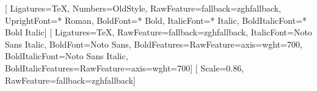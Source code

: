 
\usepackage{fontspec}
\usepackage{unicode-math}
\setmainfont{Charter}[
  Ligatures=TeX, Numbers=OldStyle,
  RawFeature={fallback=zghfallback},
  UprightFont={* Roman}, BoldFont={* Bold},
  ItalicFont={* Italic}, BoldItalicFont={* Bold Italic}]
\setsansfont{Noto Sans}[
  Ligatures=TeX, RawFeature={fallback=zghfallback},
  ItalicFont={Noto Sans Italic},
  BoldFont={Noto Sans}, BoldFeatures={RawFeature={axis={wght=700}}},
  BoldItalicFont={Noto Sans Italic}, BoldItalicFeatures={RawFeature={axis={wght=700}}}]
\setmonofont{JetBrainsMono Nerd Font}[
  Scale=0.86, RawFeature={fallback=zghfallback}]
\newcommand{\headingfont}{\sffamily}

\usepackage{xcolor}
\color{zgink}

\usepackage[
  paperwidth=7in, paperheight=9.5in,
  inner=0.92in, outer=0.72in, top=0.85in, bottom=0.9in,
  headsep=14pt, footskip=26pt]{geometry}

\usepackage{microtype}
\usepackage{ragged2e}
\linespread{1.06}
\setlength{\emergencystretch}{3em}
\usepackage{setspace}
\frenchspacing
\usepackage{needspace}


